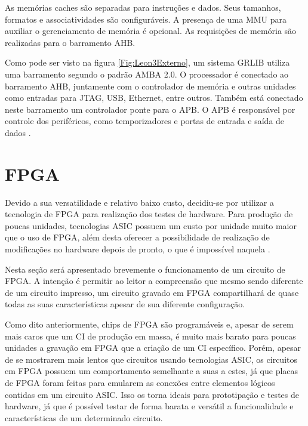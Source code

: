 As memórias caches são separadas para instruções e dados. Seus tamanhos, formatos e associatividades são configuráveis. A presença de uma MMU para auxiliar o gerenciamento de memória é opcional. As requisições de memória são realizadas para o barramento AHB.

Como pode ser visto na figura \ref{Fig:Leon3Externo}, um sistema GRLIB utiliza uma barramento segundo o padrão AMBA 2.0. O processador é conectado ao barramento AHB, juntamente com o controlador de memória e outras unidades como entradas para JTAG, USB, Ethernet, entre outros. Também está conectado neste barramento um controlador ponte para o APB. O APB é responsável por controle dos periféricos, como temporizadores e portas de entrada e saída de dados  \cite{grlibmanual}.


\section{FPGA}
\label{Fundamentacao:FPGA}

Devido a sua versatilidade e relativo baixo custo, decidiu-se por utilizar a tecnologia de FPGA para realização dos testes de hardware. Para produção de poucas unidades, tecnologias ASIC possuem um custo por unidade muito maior que o uso de FPGA, além desta oferecer a possibilidade de realização de modificações no hardware depois de pronto, o que é impossível naquela \cite{chu2006rtl}.

Nesta seção será apresentado brevemente o funcionamento de um circuito de FPGA. A intenção é permitir ao leitor a compreensão que mesmo sendo diferente de um circuito impresso, um circuito gravado em FPGA compartilhará de quase todas as suas características apesar de sua diferente configuração.


Como dito anteriormente, chips de FPGA são programáveis e, apesar de serem mais caros que um CI de produção em massa, é muito mais barato para poucas unidades a gravação em FPGA que a criação de um CI específico. Porém, apesar de se mostrarem mais lentos que circuitos usando tecnologias ASIC, os circuitos em FPGA possuem um comportamento semelhante a suas a estes, já que placas de FPGA foram feitas para emularem as conexões entre elementos lógicos contidas em um circuito ASIC.
Isso os torna ideais para prototipação e testes de hardware, já que é possível testar de forma barata e versátil a funcionalidade e características de um determinado circuito. 

